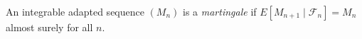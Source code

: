 
An integrable adapted sequence $(M_n)$ is a \emph{martingale} if $E[M_{n+1}\mid\mathcal F_n]=M_n$ almost surely for all $n$.
